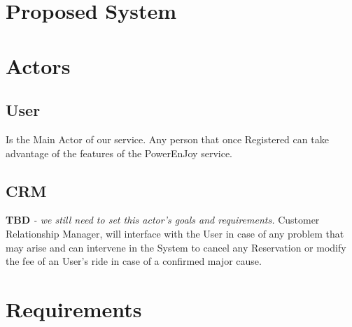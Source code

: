 \documentclass[a4paper]{article}
\begin{document}
\section{Proposed System}
\newpage

\section{Actors}
\subsection{User}
Is the Main Actor of our service. Any person that once Registered can take advantage of the features of the PowerEnJoy service.
\subsection {CRM}
\textbf{TBD} \textit{- we still need to set this actor's goals and requirements.}
Customer Relationship Manager, will interface with the User in case of any problem that may arise and can intervene in the System to cancel any Reservation or modify the fee of an User's ride in case of a confirmed major cause.

\section{Requirements}
\end{document}
